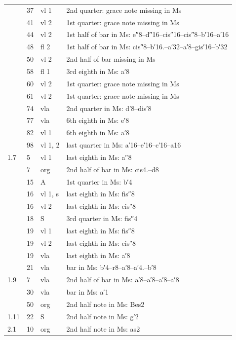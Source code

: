 \documentclass[parskip=full]{scrreprt}
\begin{document}
\begin{longtable}{lll L{10cm}}
	     & 37  & vl 1    & 2nd quarter: grace note missing in Ms \\
	     & 41  & vl 2    & 1st quarter: grace note missing in Ms \\
	     & 44  & vl 2    & 1st half of bar in Ms: e″8–d″16–cis″16–cis″8–b′16–a′16 \\
	     & 48  & fl 2    & 1st half of bar in Ms: cis″8–b′16.–a′32–a′8–gis′16–b′32 \\
	     & 50  & vl 2    & 2nd half of bar missing in Ms \\
	     & 58  & fl 1    & 3rd eighth in Ms: a′8 \\
	     & 60  & vl 2    & 1st quarter: grace note missing in Ms \\
	     & 61  & vl 2    & 1st quarter: grace note missing in Ms \\
	     & 74  & vla     & 2nd quarter in Ms: d′8–dis′8 \\
	     & 77  & vla     & 6th eighth in Ms: e′8 \\
	     & 82  & vl 1    & 6th eighth in Ms: a′8 \\
	     & 98  & vl 1, 2 & last quarter in Ms: a′16–e′16–c′16–a16 \\
	1.7  & 5   & vl 1    & last eighth in Ms: a″8 \\
	     &  7  & org     & 2nd half of bar in Ms: cis4.–d8 \\
	     & 15  & A       & 1st quarter in Ms: b′4 \\
	     & 16  & vl 1, s & last eighth in Ms: fis″8 \\
	     & 16  & vl 2    & last eighth in Ms: cis″8 \\
	     & 18  & S       & 3rd quarter in Ms: fis″4 \\
	     & 19  & vl 1    & last eighth in Ms: fis″8 \\
	     & 19  & vl 2    & last eighth in Ms: cis″8 \\
	     & 19  & vla     & last eighth in Ms: a′8 \\
	     & 21  & vla     & bar in Ms: b′4–r8–a′8–a′4.–b′8 \\
	1.9  & 7   & vla     & 2nd half of bar in Ms: a′8–a′8–a′8–a′8 \\
	     & 30  & vla     & bar in Ms: a′1 \\
	     & 50  & org     & 2nd half note in Ms: Bes2 \\
	1.11 & 22  & S       & 2nd half note in Ms: g′2 \\
	2.1  & 10  & org     & 2nd half note in Ms: as2 \\

\end{longtable}
\end{document}
